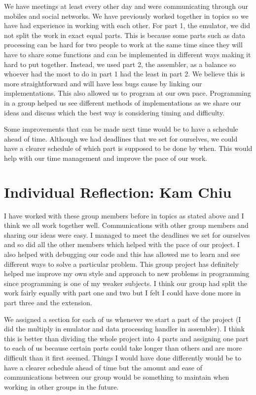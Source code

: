 \documentclass[11pt]{article}
\begin{document}
We have meetings at least every other day and were communicating through our mobiles and social networks. We have previously worked together in topics so we have had experience in working with each other. For part 1, the emulator, we did not split the work in exact equal parts. This is because some parts such as data processing can be hard for two people to work at the same time since they will have to share some functions and can be implemented in different ways making it hard to put together. Instead, we used part 2, the assembler, as a balance so whoever had the most to do in part 1 had the least in part 2. We believe this is more straightforward and will have less bugs cause by linking our implementations. This also allowed us to program at our own pace. Programming in a group helped us see different methods of implementations as we share our ideas and discuss which the best way is considering timing and difficulty. 

\medskip

Some improvements that can be made next time would be to have a schedule ahead of time. Although we had deadlines that we set for ourselves, we could have a clearer schedule of which part is supposed to be done by when. This would help with our time management and improve the pace of our work.

\section{Individual Reflection: Kam Chiu}

I have worked with these group members before in topics as stated above and I think we all work together well. Communications with other group members and sharing our ideas were easy. I managed to meet the deadlines we set for ourselves and so did all the other members which helped with the pace of our project. I also helped with debugging our code and this has allowed me to learn and see different ways to solve a particular problem. This group project has definitely helped me improve my own style and approach to new problems in programming since programming is one of my weaker subjects. I think our group had split the work fairly equally with part one and two but I felt I could have done more in part three and the extension.

\medskip

We assigned a section for each of us whenever we start a part of the project (I did the multiply in emulator and data processing handler in assembler). I think this is better than dividing the whole project into 4 parts and assigning one part to each of us because certain parts could take longer than others and are more difficult than it first seemed. 
Things I would have done differently would be to have a clearer schedule ahead of time but the amount and ease of communications between our group would be something to maintain when working in other groups in the future.
\end{document}
